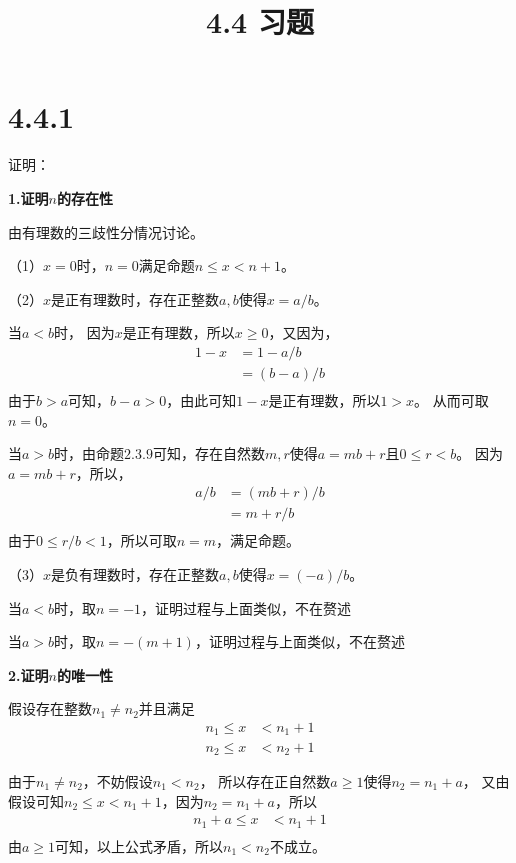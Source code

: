 \documentclass{article}
\theoremstyle{mystyle}
\begin{document}
\title{4.4 习题}
\maketitle

\section*{4.4.1}
证明：

\textbf{1.证明$n$的存在性}

由有理数的三歧性分情况讨论。

（1）$x = 0$时，$n=0$满足命题$n \leq x < n+1$。

（2）$x$是正有理数时，存在正整数$a,b$使得$x = a / b$。

当$a<b$时，
因为$x$是正有理数，所以$x \geq 0$，又因为，
\begin{align*}
  1 - x & = 1 - a/b \\
        & = (b-a)/b \\
\end{align*}
由于$b>a$可知，$b-a>0$，由此可知$1-x$是正有理数，所以$1 > x$。
从而可取$n=0$。

当$a>b$时，由命题$2.3.9$可知，存在自然数$m,r$使得$a=mb+r$且$0 \leq r < b$。
因为$a=mb+r$，所以，
\begin{align*}
  a/b & = (mb + r) / b \\
      & = m + r/b      \\
\end{align*}
由于$0 \leq r/b < 1$，所以可取$n=m$，满足命题。

（3）$x$是负有理数时，存在正整数$a,b$使得$x = (-a) / b$。

当$a<b$时，取$n=-1$，证明过程与上面类似，不在赘述

当$a>b$时，取$n=-(m+1)$，证明过程与上面类似，不在赘述

\textbf{2.证明$n$的唯一性}

假设存在整数$n_1 \neq n_2$并且满足
\begin{align}
  n_1  \leq x & < n_1 + 1 \\
  n_2  \leq x & < n_2 + 1
\end{align}

由于$n_1 \neq n_2$，不妨假设$n_1 < n_2$，
所以存在正自然数$a \geq 1$使得$n_2 = n_1 + a$，
又由假设可知$n_2 \leq x < n_1 + 1$，因为$n_2 = n_1 + a$，所以
\begin{align*}
  n_1 + a  \leq x & < n_1 + 1 \\
\end{align*}
由$a \geq 1$可知，以上公式矛盾，所以$n_1 < n_2$不成立。
\end{document}
